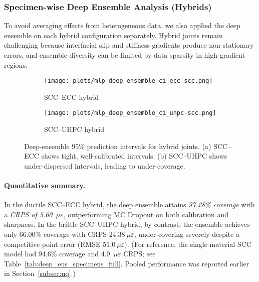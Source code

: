 \documentclass{article}
\begin{document}
\subsubsection{Specimen-wise Deep Ensemble Analysis (Hybrids)}
\label{subsec:deep_ens_specimens_hybrids}

To avoid averaging effects from heterogeneous data, we also applied the deep ensemble on each hybrid configuration separately. Hybrid joints remain challenging because interfacial slip and stiffness gradients produce non-stationary errors, and ensemble diversity can be limited by data sparsity in high-gradient regions.

\begin{figure}[t]
\centering
\begin{subfigure}[t]{0.48\linewidth}
    \centering
    \texttt{[image: plots/mlp\_deep\_ensemble\_ci\_ecc-scc.png]}
    \caption{SCC--ECC hybrid}
    \label{fig:ens_scc_ecc}
\end{subfigure}\hfill
\begin{subfigure}[t]{0.48\linewidth}
    \centering
    \texttt{[image: plots/mlp\_deep\_ensemble\_ci\_uhpc-scc.png]}
    \caption{SCC--UHPC hybrid}
    \label{fig:ens_scc_uhpc}
\end{subfigure}
\caption{Deep-ensemble $95\%$ prediction intervals for hybrid joints. 
(a) SCC--ECC shows tight, well-calibrated intervals. 
(b) SCC--UHPC shows under-dispersed intervals, leading to under-coverage.}
\label{fig:ens_hybrids_sidebyside}
\end{figure}


\paragraph{Quantitative summary.} In the ductile SCC–ECC hybrid, the deep ensemble attains \emph{97.28\% coverage} with a \emph{CRPS of 5.60~$\mu\varepsilon$}, outperforming MC Dropout on both calibration and sharpness. In the brittle SCC–UHPC hybrid, by contrast, the ensemble achieves only 66.00\% coverage with CRPS $24.38~\mu\varepsilon$, under-covering severely despite a competitive point error (RMSE $51.0~\mu\varepsilon$). (For reference, the single-material SCC model had 94.6\% coverage and 4.9~$\mu\varepsilon$ CRPS; see Table~\ref{tab:deep_ens_specimens_full}. Pooled performance was reported earlier in Section~\ref{subsec:uq}.)
\end{document}
